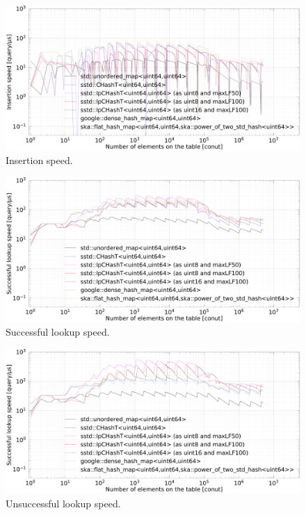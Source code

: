 \begin{figure}[h]
  \hspace{-3mm}
  \includegraphics[scale=0.24]{./fig_bench/insert_med.pdf}
  \caption{ Insertion speed. }
  \label{fig_bench_insert}
\end{figure}

\begin{figure}[h]
  \hspace{-3mm}
  \includegraphics[scale=0.24]{./fig_bench/find_successful_lookup_med.pdf}
  \caption{ Successful lookup speed. }
  \label{fig_bench_insert}
\end{figure}

\begin{figure}[h]
  \hspace{-3mm}
  \includegraphics[scale=0.24]{./fig_bench/find_unsuccessful_lookup_med.pdf}
  \caption{ Unsuccessful lookup speed. }
  \label{fig_bench_insert}
\end{figure}

